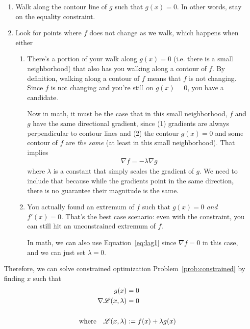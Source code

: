 \documentclass[a4paper,12pt]{scrartcl}
\theoremstyle{definition}
\theoremstyle{remark}
\begin{document}
\begin{enumerate}
  \item Walk along the contour line of $g$ such that $g(x)=0$. In other
    words, stay on the equality constraint.
  \item Look for points where $f$ does not change as we walk, which
    happens when either
    \begin{enumerate}
      \item There's a portion of your walk along $g(x)=0$ (i.e. there is
        a small neighborhood) that also has you walking along a contour
        of $f$. By definition, walking along a contour of $f$ means that
        $f$ is not changing. Since $f$ is not changing and you're still
        on $g(x)=0$, you have a candidate.

        Now in math, it must be the case that in this small
        neighborhood, $f$ and $g$ have the same directional gradient,
        since (1) gradients are always perpendicular to contour lines
        and (2) the contour $g(x)=0$ and some contour of $f$ are
        \emph{the same} (at least in this small neighborhood). That
        implies
        \begin{align}
          \nabla f = -\lambda \nabla g
          \label{eq:lag1}
        \end{align}
        where $\lambda$ is a constant that simply scales the gradient of
        $g$. We need to include that because while the gradients point
        in the same direction, there is no guarantee their magnitude is
        the same.

      \item You actually found an extremum of $f$ such that $g(x)=0$
        \emph{and} $f'(x)=0$. That's the best case scenario: even with
        the constraint, you can still hit an unconstrained extremum of
        $f$.

        In math, we can also use Equation~\ref{eq:lag1} since
        $\nabla f=0$ in this case, and we can just set $\lambda=0$.
    \end{enumerate}
  \end{enumerate}
Therefore, we can solve constrained optimization
Problem~\ref{prob:constrained} by finding $x$ such that
\begin{align}
  g(x) &= 0\label{lagrangeSingle}\\
  \nabla \mathscr{L}(x,\lambda) &= 0 \notag\\\notag\\
  \text{where} \quad
  \mathscr{L}(x,\lambda) &:= f(x) + \lambda g(x) \notag
\end{align}
\end{document}
